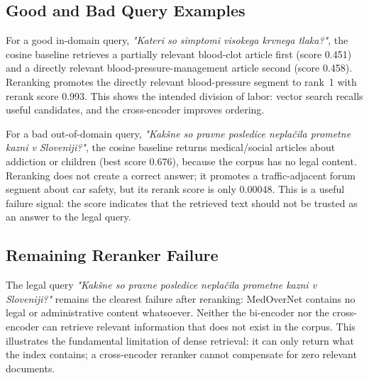 \documentclass[9pt]{IEEEtran}
\begin{document}
\subsection{Good and Bad Query Examples}
For a good in-domain query, \textit{"Kateri so simptomi visokega krvnega tlaka?"}, the cosine baseline retrieves a partially relevant blood-clot article first (score 0.451) and a directly relevant blood-pressure-management
article second (score 0.458). Reranking promotes the directly relevant blood-pressure segment to rank~1 with rerank score 0.993. This shows the intended division of labor: vector search recalls useful candidates, and the cross-encoder improves ordering.

For a bad out-of-domain query, \textit{"Kakšne so pravne posledice neplačila prometne kazni v Sloveniji?"}, the cosine baseline returns medical/social articles about addiction or children (best score 0.676),
because the corpus has no legal content. Reranking does not create a correct answer; it promotes a traffic-adjacent forum segment about car safety, but its rerank score is only 0.00048.
This is a useful failure signal: the score indicates that the retrieved text should not be trusted as an answer to the legal query.

\subsection{Remaining Reranker Failure}
The legal query \textit{"Kakšne so pravne posledice neplačila prometne kazni v Sloveniji?"} remains the clearest failure after reranking: MedOverNet contains no legal or administrative content whatsoever.
Neither the bi-encoder nor the cross-encoder can retrieve relevant information that does not exist in the corpus. This illustrates the fundamental limitation of dense retrieval: it can only return what the index contains;
a cross-encoder reranker cannot compensate for zero relevant documents.
\end{document}

